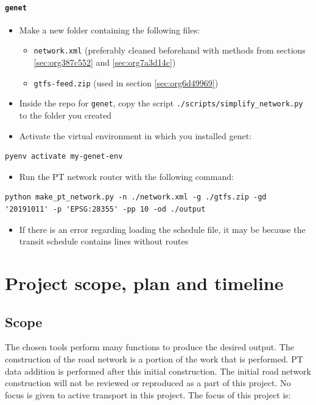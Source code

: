 \documentclass[11pt]{article}
\begin{document}
\paragraph{\texttt{genet}}
\label{sec:orga5449fa}
\begin{itemize}
\item Make a new folder containing the following files:
\begin{itemize}
\item \texttt{network.xml} (preferably cleaned beforehand with methods from sections \ref{sec:org387c552} and \ref{sec:org7a3d14c})
\item \texttt{gtfs-feed.zip} (used in section \ref{sec:org6d49969})
\end{itemize}
\item Inside the repo for \texttt{genet}, copy the script \texttt{./scripts/simplify\_network.py} to the folder you created
\item Activate the virtual environment in which you installed genet:
\end{itemize}
\begin{verbatim}
pyenv activate my-genet-env
\end{verbatim}

\begin{itemize}
\item Run the PT network router with the following command:
\end{itemize}
\begin{verbatim}
python make_pt_network.py -n ./network.xml -g ./gtfs.zip -gd '20191011' -p 'EPSG:28355' -pp 10 -od ./output
\end{verbatim}

\begin{itemize}
\item If there is an error regarding loading the schedule file, it may be because the transit schedule contains lines without routes
\end{itemize}
\section{Project scope, plan and timeline}
\label{sec:org6a5729c}
\subsection{Scope}
\label{sec:orgd3d4aa2}
The chosen tools perform many functions to produce the desired output. The construction of the road network is a portion of the work that is performed. PT data addition is performed after this initial construction. The initial road network construction will not be reviewed or reproduced as a part of this project.
No focus is given to active transport in this project. The focus of this project is:
\end{document}
